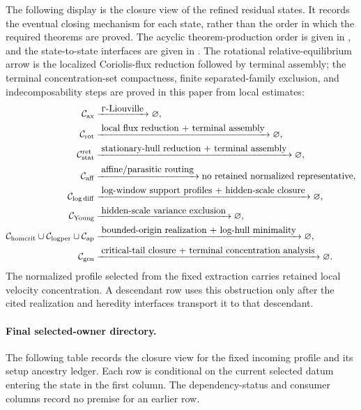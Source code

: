 \documentclass[11pt]{amsart}
\numberwithin{equation}{section}
\theoremstyle{plain}
\theoremstyle{definition}
\theoremstyle{remark}
\newcommand{\Cax}{\mathcal C_{\mathrm{ax}}}
\newcommand{\Crot}{\mathcal C_{\mathrm{rot}}}
\newcommand{\Cstat}{\mathcal C_{\mathrm{stat}}^{\mathrm{ret}}}
\newcommand{\Caff}{\mathcal C_{\mathrm{aff}}}
\newcommand{\Cgen}{\mathcal C_{\mathrm{gen}}}
\newcommand{\Chomcrit}{\mathcal C_{\mathrm{homcrit}}}
\newcommand{\Clogper}{\mathcal C_{\mathrm{logper}}}
\newcommand{\Capcrit}{\mathcal C_{\mathrm{ap}}}
\newcommand{\Cyoung}{\mathcal C_{\mathrm{Young}}}
\newcommand{\Clogdiff}{\mathcal C_{\log\mathrm{diff}}}
\begin{document}
The following display is the closure view of the refined residual states.  It
records the eventual closing mechanism for each state, rather than the order in
which the required theorems are proved.  The acyclic theorem-production order
is given in
, and the
state-to-state interfaces are given in
.  The rotational
relative-equilibrium arrow is the localized Coriolis-flux reduction followed by
terminal assembly; the terminal concentration-set compactness, finite
separated-family exclusion, and indecomposability steps are proved in this
paper from local estimates:
\[
\begin{aligned}
\Cax
   &\xrightarrow{\;\Gamma\hbox{-Liouville}\;}
   \varnothing,\\
\Crot
   &\xrightarrow{\;\hbox{local flux reduction + terminal assembly}\;}
   \varnothing,\\
\Cstat
   &\xrightarrow{\;\hbox{stationary-hull reduction + terminal assembly}\;}
   \varnothing,\\
\Caff
   &\xrightarrow{\;\hbox{affine/parasitic routing}\;}
   \hbox{no retained normalized representative},\\
\Clogdiff
   &\xrightarrow{\;\hbox{log-window support profiles + hidden-scale closure}\;}
   \varnothing,\\
\Cyoung
   &\xrightarrow{\;\hbox{hidden-scale variance exclusion}\;}
   \varnothing,\\
\Chomcrit\cup\Clogper\cup\Capcrit
   &\xrightarrow{\;\hbox{bounded-origin realization + log-hull minimality}\;}
   \varnothing,\\
\Cgen
   &\xrightarrow{\;\hbox{critical-tail closure + terminal concentration analysis}\;}
   \varnothing .
\end{aligned}
\]
The normalized profile selected from the fixed extraction carries retained
local velocity concentration.  A descendant row uses this obstruction only
after the cited realization and heredity interfaces transport it to that
descendant.

\paragraph{Final selected-owner directory.}
The following table records the closure view for the fixed incoming profile and
its setup ancestry ledger.  Each row is conditional on the current selected
datum entering the state in the first column.  The dependency-status and
consumer columns record no premise for an earlier row.
\end{document}
